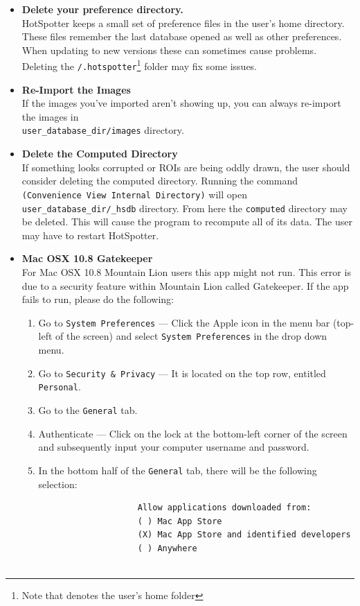 \documentclass[a4paper,10pt]{article}
\begin{document}
\begin{itemize}
    \item \textbf{Delete your preference directory.}\\
        HotSpotter keeps a small set of preference files in the user's  home directory.
        These files remember the last database opened as well as other
        preferences. When updating to new versions these can sometimes cause
        problems. Deleting the {\tt \texttildelow/.hotspotter}\footnote{Note
            that {\tt \texttildelow} denotes the user's home folder} folder may fix some issues.\\

    \item \textbf{Re-Import the Images}\\
        If the images you've imported aren't showing up, you can always re-import
        the images in\\ {\tt user\_database\_dir/images} directory.\\

    \item \textbf{Delete the Computed Directory}\\
        If something looks corrupted or ROIs are being oddly drawn, the user
        should consider deleting the computed directory.  Running  the command 
        {\tt (Convenience \textrightarrow{} View Internal Directory)} will open
        {\tt user\_database\_dir/\_hsdb} directory. From here the
        {\tt computed} directory may be deleted. This will cause the program
        to recompute all of its data. The user may have to restart HotSpotter.\\


    \item \textbf{Mac OSX 10.8 Gatekeeper}\\ For Mac OSX 10.8 Mountain
      Lion users this app might not run.  This error is due to a
      security feature within Mountain Lion called Gatekeeper.  If the
      app fails to run, please do the following:
        \begin{enumerate}
            \item Go to {\tt System Preferences} --- Click the Apple icon in the menu bar (top-left of the screen) and select {\tt System Preferences} in the drop down menu.
            \item Go to {\tt Security \& Privacy} --- It is located on the top row, entitled {\tt Personal}.
            \item Go to the {\tt General} tab.
            \item Authenticate --- Click on the lock at the bottom-left corner of the screen and subsequently input your computer username and password.
            \item In the bottom half of the {\tt General} tab, there will be the following selection:
                \begin{Verbatim}
                    Allow applications downloaded from:
                    ( ) Mac App Store
                    (X) Mac App Store and identified developers
                    ( ) Anywhere


\end{Verbatim}
\end{enumerate}
\end{itemize}
\end{document}
